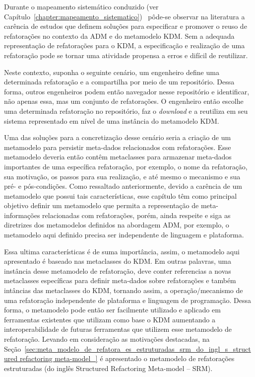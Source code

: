 Durante o mapeamento sistemático conduzido (ver Capítulo~\ref{chapter:mapeamento_sistematico})~\cite{durelli_systematic_mapping} pôde-se observar na literatura a carência de estudos que definem soluções para especificar e promover o reuso de refatorações no contexto da ADM e do metamodelo KDM. Sem a adequada representação de refatorações para o KDM, a especificação e realização de uma refatoração pode se tornar uma atividade propensa a erros e difícil de reutilizar.

Neste contexto, suponha o seguinte cenário, um engenheiro define uma determinada refatoração e a compartilha por meio de um repositório. Dessa forma, outros engenheiros podem então navegador nesse repositório e identificar, não apenas essa, mas um conjunto de refatorações. O engenheiro então escolhe uma determinada refatoração no repositório, faz o \textit{download} e a reutiliza em seu sistema representado em nível de uma instância do metamodelo KDM. 

Uma das soluções para a concretização desse cenário seria a criação de um metamodelo para persistir meta-dados relacionados com refatorações. Esse metamodelo deveria então contêm metaclasses para armazenar meta-dados importantes de uma específica refatoração, por exemplo, o nome da refatoração, sua motivação, os passos para sua realização, e até mesmo o mecanismo e sua pré- e pós-condições. Como ressaltado anteriormente, devido a carência de um metamodelo que possui tais características, esse capítulo têm como principal objetivo definir um metamodelo que permita a representação de meta-informações relacionadas com refatorações, porém, ainda respeite e siga as diretrizes dos metamodelos definidos na abordagem ADM, por exemplo, o metamodelo aqui definido precisa ser independente de linguagem e plataforma.

Essa ultima características é de suma importância, assim, o metamodelo aqui apresentado é baseado nas metaclasses do KDM. Em outras palavras, uma instância desse metamodelo de refatoração, deve conter referencias a novas metaclasses específicas para definir meta-dados sobre refatorações e também intâncias das metaclasses do KDM, tornando assim, a operação/mecanismo de uma refatoração independente de plataforma e linguagem de programação. Dessa forma, o metamodelo pode então ser facilmente utilizado e aplicado em ferramentas existentes que utilizam como base o KDM aumentando a interoperabilidade de futuras ferramentas que utilizem esse metamodelo de refatoração. Levando em consideração as motivações destacadas, na Seção~\ref{sec:meta_modelo_de_refatora_es_estruturadas_srm_do_ingl_s_structured refactoring meta-model_} é apresentado o metamodelo de refatorações estruturadas (do inglês Structured Refactoring Meta-model – SRM).  


